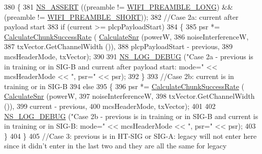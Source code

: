 \begin{DoxyCode}
380         \{
381           \hyperlink{assert_8h_a6dccdb0de9b252f60088ce281c49d052}{NS\_ASSERT} ((preamble != \hyperlink{group__wifi_gga5e94a56cb338a14ffbbb19c6a41251eba12f3d9468d1630bd38bbef20df1e3eda}{WIFI\_PREAMBLE\_LONG}) && (preamble != 
      \hyperlink{group__wifi_gga5e94a56cb338a14ffbbb19c6a41251ebab9a39ca1f62d36c33ac489c4cf59745b}{WIFI\_PREAMBLE\_SHORT}));
382           \textcolor{comment}{//Case 2a: current after payload start}
383           \textcolor{keywordflow}{if} (current >= plcpPayloadStart)
384             \{
385               psr *= \hyperlink{classns3_1_1InterferenceHelper_ab1c34c3f7ecef1e37ec778c0cf0e9cef}{CalculateChunkSuccessRate} (
      \hyperlink{classns3_1_1InterferenceHelper_a8f6192d041874595004c007c5a519b4b}{CalculateSnr} (powerW,
386                                                               noiseInterferenceW,
387                                                               txVector.GetChannelWidth ()),
388                                                 plcpPayloadStart - previous,
389                                                 mcsHeaderMode, txVector);
390 
391               \hyperlink{group__logging_ga413f1886406d49f59a6a0a89b77b4d0a}{NS\_LOG\_DEBUG} (\textcolor{stringliteral}{"Case 2a - previous is in training or in SIG-B and current after
       payload start: mode="} << mcsHeaderMode << \textcolor{stringliteral}{", psr="} << psr);
392             \}
393           \textcolor{comment}{//Case 2b: current is in training or in SIG-B}
394           \textcolor{keywordflow}{else}
395             \{
396               psr *= \hyperlink{classns3_1_1InterferenceHelper_ab1c34c3f7ecef1e37ec778c0cf0e9cef}{CalculateChunkSuccessRate} (
      \hyperlink{classns3_1_1InterferenceHelper_a8f6192d041874595004c007c5a519b4b}{CalculateSnr} (powerW,
397                                                               noiseInterferenceW,
398                                                               txVector.GetChannelWidth ()),
399                                                 current - previous,
400                                                 mcsHeaderMode, txVector);
401 
402               \hyperlink{group__logging_ga413f1886406d49f59a6a0a89b77b4d0a}{NS\_LOG\_DEBUG} (\textcolor{stringliteral}{"Case 2b - previous is in training or in SIG-B and current is in
       training or in SIG-B: mode="} << mcsHeaderMode << \textcolor{stringliteral}{", psr="} << psr);
403             \}
404         \}
405       \textcolor{comment}{//Case 3: previous is in HT-SIG or SIG-A: legacy will not enter here since it didn't enter in the
       last two and they are all the same for legacy}

\end{DoxyCode}
